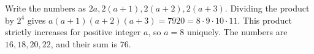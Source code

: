 Write the numbers as $2a,2(a+1),2(a+2),2(a+3)$. Dividing the product by $2^4$ gives $a(a+1)(a+2)(a+3)=7920=8\cdot9\cdot10\cdot11$. This product strictly increases for positive integer $a$, so $a=8$ uniquely. The numbers are $16,18,20,22$, and their sum is $\boxed{76}$.
